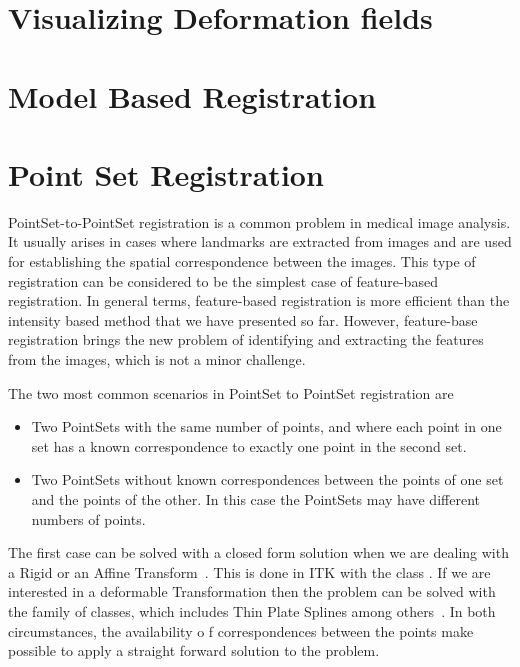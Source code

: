 \section{Visualizing Deformation fields}
\label{sec:VisualizingDeformationFields}
\ifitkFullVersion

\fi

\ifitkFullVersion

\fi


\clearpage



\section{Model Based Registration}
\label{sec:ModelBasedRegistration}
\ifitkFullVersion

\fi


\section{Point Set Registration}
\label{sec:PointSetRegistration}

PointSet-to-PointSet registration is a common problem in medical image
analysis. It usually arises in cases where landmarks are extracted from images
and are used for establishing the spatial correspondence between the images.
This type of registration can be considered to be the simplest case of
feature-based registration. In general terms, feature-based registration is
more efficient than the intensity based method that we have presented so far.
However, feature-base registration brings the new problem of identifying and
extracting the features from the images, which is not a minor challenge.

The two most common scenarios in PointSet to PointSet registration are

\begin{itemize}
\item Two PointSets with the same number of points, and where each point in one
set has a known correspondence to exactly one point in the second set.
\item Two PointSets without known correspondences between the points of one set
and the points of the other. In this case the PointSets may have different
numbers of points.
\end{itemize}

The first case can be solved with a closed form solution when we are dealing
with a Rigid or an Affine Transform~\cite{Horn1987}. This is done in ITK with
the class . If we are interested in
a deformable Transformation then the problem can be solved with the
 family of classes, which includes Thin Plate Splines
among others~\cite{Rohr2001}. In both circumstances, the availability o f
correspondences between the points make possible to apply a straight forward
solution to the problem.


